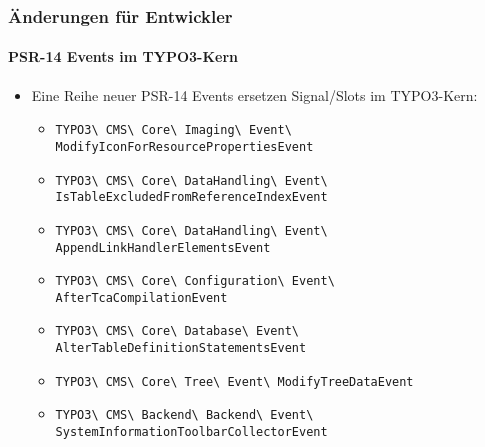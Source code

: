 \begin{frame}[fragile]
	\frametitle{Änderungen für Entwickler}
	\framesubtitle{PSR-14 Events im TYPO3-Kern}

	\begin{itemize}
		\item Eine Reihe neuer PSR-14 Events ersetzen Signal/Slots im TYPO3-Kern:
			\newline

			\begin{itemize}\tiny
				\item \texttt{TYPO3\textbackslash
					CMS\textbackslash
					Core\textbackslash
					Imaging\textbackslash
					Event\textbackslash
					ModifyIconForResourcePropertiesEvent}
					\newline
				\item \texttt{TYPO3\textbackslash
					CMS\textbackslash
					Core\textbackslash
					DataHandling\textbackslash
					Event\textbackslash
					IsTableExcludedFromReferenceIndexEvent}
					\newline
				\item \texttt{TYPO3\textbackslash
					CMS\textbackslash
					Core\textbackslash
					DataHandling\textbackslash
					Event\textbackslash
					AppendLinkHandlerElementsEvent}
					\newline
				\item \texttt{TYPO3\textbackslash
					CMS\textbackslash
					Core\textbackslash
					Configuration\textbackslash
					Event\textbackslash
					AfterTcaCompilationEvent}
					\newline
				\item \texttt{TYPO3\textbackslash
					CMS\textbackslash
					Core\textbackslash
					Database\textbackslash
					Event\textbackslash
					AlterTableDefinitionStatementsEvent}
					\newline
				\item \texttt{TYPO3\textbackslash
					CMS\textbackslash
					Core\textbackslash
					Tree\textbackslash
					Event\textbackslash
					ModifyTreeDataEvent}
					\newline
				\item \texttt{TYPO3\textbackslash
					CMS\textbackslash
					Backend\textbackslash
					Backend\textbackslash
					Event\textbackslash
					SystemInformationToolbarCollectorEvent}
					\newline
			\end{itemize}

	\end{itemize}

\end{frame}

